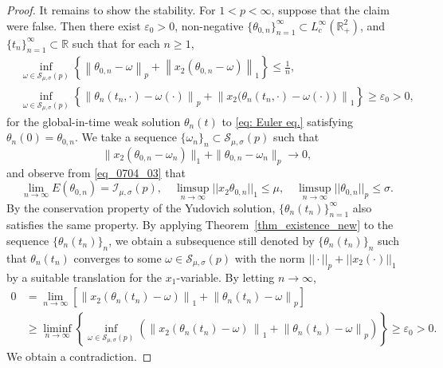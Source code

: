 \documentclass[10pt,a4paper]{amsart}
\theoremstyle{definition}
\theoremstyle{definition}
\numberwithin{equation}{section}
\newcommand{\set}[1]{\{#1\}}
\newcommand{\0}{\emptyset}
\newcommand{\omg}{\omega}
\newcommand{\calI}{\mathcal I}
\newcommand{\calS}{\mathcal S}
\begin{document}
\begin{proof}
				It remains to show the stability. For $1<p<\infty$, suppose that the claim were false. Then there exist $\varepsilon_0>0$, non-negative $\{\theta_{0, n} \}_{n = 1}^{\infty}\subset L^{\infty}_{c}(\mathbb{R}^{2}_{+})$, and $\{t_n\}_{n = 1}^{\infty}\subset \mathbb{R}$ such that for each $n \ge 1$, 
				\begin{align*}\label{eq241228_2}
					&\inf_{\omega \in \calS_{\mu,\sigma}(p)} \left\{  \left\| \theta_{0, n} - \omega \right\|_{p} + \left\| x_2 (\theta_{0, n} - \omega) \right\|_{1} \right\}   \le  \frac{1}{n},\\
					&\inf_{\omega \in \calS_{\mu,\sigma}(p)}\left\{  \left\| \theta_{n} \left(t_n, \cdot \right) - \omg \left( \cdot  \right) \right\|_{p} + \left\| x_2 \big( \theta_{n} \left(t_n, \cdot \right) - \omega \left( \cdot  \right) \big) \, \right\|_{1}  \right\}  \ge  \varepsilon_0>0,
				\end{align*}
				for the global-in-time weak solution $ \theta_n(t)$ to \eqref{eq: Euler eq.} satisfying $\theta_n(0) = \theta_{0, n}$. We take a sequence $\{\omega_n\}_{n} \subset \calS_{\mu,\sigma}(p)$ such that
				\[
				\| x_2 (\theta_{0, n} - \omega_n) \|_{1} + \| \theta_{0, n} - \omega_n\|_{p}  \to  0,
				\]
				and observe from \eqref{eq_0704_03} that  
				\[
				\lim_{n \to \infty}E(\theta_{0, n}) = \calI_{\mu,\sigma}(p),\quad \limsup_{n\to\infty}||x_2\theta_{0, n}||_{1}\leq \mu, \quad \limsup_{n\to\infty}||\theta_{0, n} ||_{p}\leq \sigma.
				\]
				By the conservation property of the Yudovich solution, $\set{\theta_{n}(t_n)}_{n=1}^\infty$ also satisfies the same property. By applying Theorem~\ref{thm_existence_new} to the sequence $\{ \theta_n(t_n)  \}_{n}$, we obtain a subsequence still denoted by $\{ \theta_n(t_n)  \}_{n}$ such that $\theta_n(t_n)$ converges to some ${\omega} \in \calS_{\mu,\sigma}(p)$ with the norm $||\cdot ||_{p}+||x_2(\cdot)||_{1}$ by a suitable translation for the $x_1$-variable. By letting $n \to \infty$,
				\begin{align*}
					0 &=  \lim_{n \to \infty} \left[	\left\| x_2 \left( \theta_n (t_n) - {\omega} \right) \right\|_{1} +    \left\|  \theta_n (t_n) - {\omega} \right\|_{p} \right] \\
					&\ge  \liminf_{n \to \infty} \left\{ \inf_{\omega \in \calS_{\mu,\sigma}(p)} \left(   \left\| x_2 \left( \theta_{n} \left(t_n\right) - \omega \right)\, \right\|_{1} + \left\| \theta_{n} \left(t_n \right) - \omega \right\|_{p} \right) \right\}  \ge  \varepsilon_0>0.
				\end{align*}
				We obtain a contradiction.
				

\end{proof}
\end{document}
